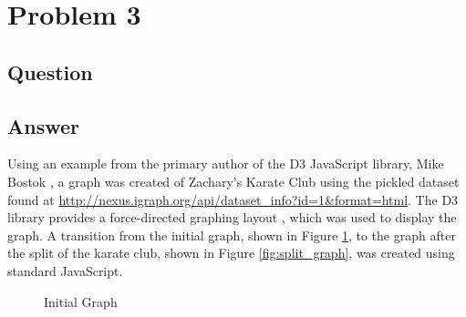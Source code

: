 \section{Problem 3}

\subsection{Question}
\vspace*{10pt}
\justify 


\subsection{Answer}
Using an example from the primary author of the D3 JavaScript library, Mike Bostok \cite{d3:bostok12}, a graph was created of Zachary's Karate Club using the pickled \cite{py:pickle} dataset found at \url{http://nexus.igraph.org/api/dataset_info?id=1&format=html}. The D3 library provides a force-directed graphing layout \cite{d3:force14}, which was used to display the graph. A transition from the initial graph, shown in Figure \ref{fig:init_graph}, to the graph after the split of the karate club, shown in Figure \ref{fig:split_graph}, was created using standard JavaScript.

\begin{figure}[h!]
\centering
{}
\caption{Initial Graph}
\label{fig:init_graph}
\end{figure}

